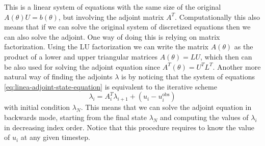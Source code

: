 This is a linear system of equations with the same size of the original $A(\theta) U = b(\theta)$, but involving the adjoint matrix $A^T$. 
Computationally this also means that if we can solve the original system of discretized equations then we can also solve the adjoint. 
One way of doing this is relying on matrix factorization. 
Using the LU factorization we can write the matrix $A(\theta)$ as the product of a lower and upper triangular matrices $A (\theta) = LU$, which then can be also used for solving the adjoint equation since $A^T(\theta)=U^TL^T$.
Another more natural way of finding the adjoints $\lambda$ is by noticing that the system of equations \eqref{eq:linea-adjoint-state-equation} is equivalent to the iterative scheme
\begin{equation}
    \lambda_{i} = A_{i}^T \lambda_{i+1} + (u_i - u_i^\text{obs})
\end{equation}
with initial condition $\lambda_N$. 
This means that we can solve the adjoint equation in backwards mode, starting from the final state $\lambda_N$ and computing the values of $\lambda_i$ in decreasing index order. 
Notice that this procedure requires to know the value of $u_i$ at any given timestep. 




